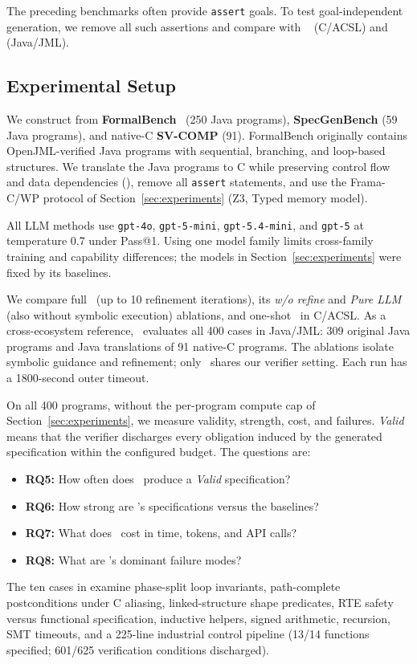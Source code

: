 \label{sec:large-scale-experiment}
The preceding benchmarks often provide \texttt{assert} goals. To test
goal-independent generation, we remove all such assertions and compare with
\autospec~\cite{autospec} (C/ACSL) and \specgen~\cite{SpecGen} (Java/JML).

\subsection{Experimental Setup}
We construct \textbf{} from \textbf{FormalBench}~\cite{le2025can}
(250 Java programs), \textbf{SpecGenBench} (59 Java programs), and native-C
\textbf{SV-COMP} (91). FormalBench originally contains OpenJML-verified Java
programs with sequential, branching, and loop-based structures. We translate
the Java programs to C while preserving
control flow and data dependencies {()},
remove all \texttt{assert} statements, and use the Frama-C/WP protocol of
Section~\ref{sec:experiments} (Z3, Typed memory model).

All LLM methods use \texttt{gpt-4o}, \texttt{gpt-5-mini},
\texttt{gpt-5.4-mini}, and \texttt{gpt-5} at temperature 0.7 under Pass@1.
Using one model family limits cross-family training and capability differences;
the models in Section~\ref{sec:experiments} were fixed by its baselines.

We compare full \toolname\ (up to 10 refinement iterations), its \emph{w/o
refine} and \emph{Pure LLM} (also without symbolic execution) ablations, and
one-shot \autospec\ in C/ACSL. {As a cross-ecosystem reference, \specgen\ evaluates all 400 cases in Java/JML: 309 original Java programs and Java translations of 91 native-C programs.} The ablations isolate symbolic
guidance and refinement; only \autospec\ shares our verifier setting. Each
run has a 1800-second outer timeout.

On all 400 programs, without the per-program compute cap of
Section~\ref{sec:experiments}, we measure validity, strength, cost, and failures.
\emph{Valid} means that the verifier discharges every obligation induced by the
generated specification within the configured budget. The questions are:
\begin{itemize}
    \item \textbf{RQ5:} How often does \toolname\ produce a
    \emph{Valid} specification?
    \item \textbf{RQ6:} How strong are \toolname's specifications
    versus the baselines?
    \item \textbf{RQ7:} What does \toolname\ cost in time, tokens, and
    API calls?
    \item \textbf{RQ8:} What are \toolname's dominant failure modes?
\end{itemize}






{The ten cases in  examine phase-split loop
invariants, path-complete postconditions under C aliasing, linked-structure
shape predicates, RTE safety versus functional specification, inductive
helpers, signed arithmetic, recursion, SMT timeouts, and a 225-line
industrial control pipeline (13/14 functions specified; 601/625 verification
conditions discharged).}
